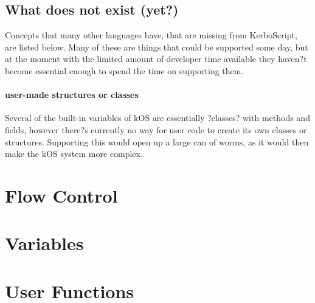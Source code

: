\subsection{What does not exist (yet?)}
Concepts that many other languages have, that are missing from KerboScript, are listed below. Many of these are things that could be supported some day, but at the moment with the limited amount of developer time available they haven?t become essential enough to spend the time on supporting them.

\paragraph{user-made structures or classes}
Several of the built-in variables of kOS are essentially ?classes? with methods and fields, however there?s currently no way for user code to create its own classes or structures. Supporting this would open up a large can of worms, as it would then make the kOS system more complex.
	\section{Flow Control}
	\section{Variables}
	\section{User Functions}